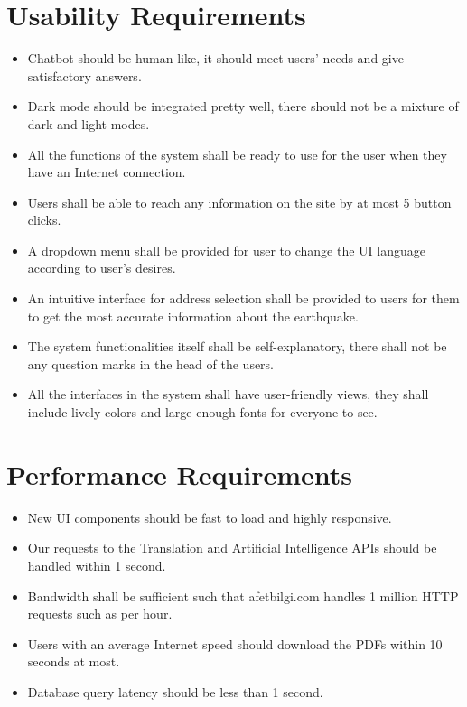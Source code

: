 \documentclass[listof=nochaptergap]{report}
\begin{document}
\section{Usability Requirements}
\begin{itemize}
    \item Chatbot should be human-like, it should meet users' needs and give satisfactory answers.
    \item Dark mode should be integrated pretty well, there should not be a mixture of dark and light modes.
    \item All the functions of the system shall be ready to use for the user when they have an Internet connection.
    \item Users shall be able to reach any information on the site by at most 5 button clicks.
    \item A dropdown menu shall be provided for user to change the UI language according to user's desires.
    \item An intuitive interface for address selection shall be provided to users for them to get the most accurate information about the earthquake.
    \item The system functionalities itself shall be self-explanatory, there shall not be any question marks in the head of the users.
    \item All the interfaces in the system shall have user-friendly views, they shall include lively colors and large enough fonts for everyone to see.
\end{itemize}

\section{Performance Requirements}
\begin{itemize}
    \item New UI components should be fast to load and highly responsive.
    \item Our requests to the Translation and Artificial Intelligence APIs should be handled within 1 second.
    \item Bandwidth shall be sufficient such that afetbilgi.com handles 1 million HTTP requests such as per hour. 
    \item Users with an average Internet speed should download the PDFs within 10 seconds at most.
    \item Database query latency should be less than 1 second.
\end{itemize}
\end{document}
